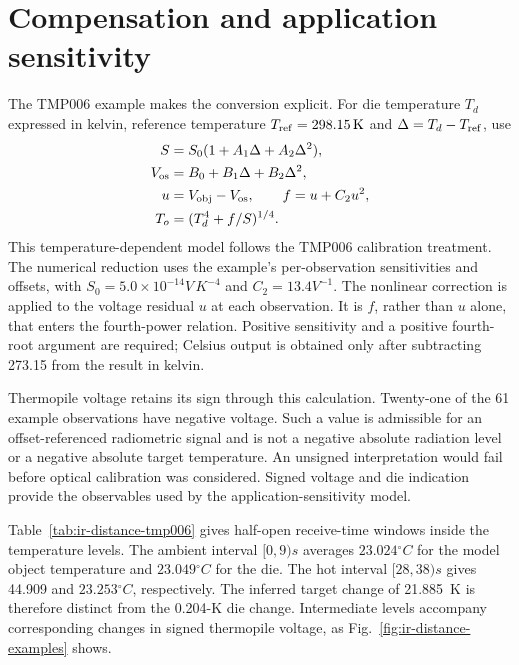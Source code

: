 \section{Compensation and application sensitivity}
The TMP006 example makes the conversion explicit. For die temperature $T_d$ expressed in kelvin, reference temperature $T_{\rm ref}=298.15\,\mathrm{K}$ and $\Delta=T_d-T_{\rm ref}$, use
\begin{equation}
 \begin{aligned}
 S&=S_0(1+A_1\Delta+A_2\Delta^2),\\
 V_{\rm os}&=B_0+B_1\Delta+B_2\Delta^2,\\
 u&=V_{\rm obj}-V_{\rm os},\qquad f=u+C_2u^2,\\
 T_o&=(T_d^4+f/S)^{1/4}.
 \end{aligned}
 \label{eq:ir-distance-compensation}
\end{equation}
This temperature-dependent model follows the TMP006 calibration treatment\cite{tmp006guide}. The numerical reduction uses the example's per-observation sensitivities and offsets, with $S_0=5.0\times10^{-14}\unit{V\,K^{-4}}$ and $C_2=13.4\unit{V^{-1}}$. The nonlinear correction is applied to the voltage residual $u$ at each observation. It is $f$, rather than $u$ alone, that enters the fourth-power relation. Positive sensitivity and a positive fourth-root argument are required; Celsius output is obtained only after subtracting 273.15 from the result in kelvin.

Thermopile voltage retains its sign through this calculation. Twenty-one of the 61 example observations have negative voltage. Such a value is admissible for an offset-referenced radiometric signal and is not a negative absolute radiation level or a negative absolute target temperature. An unsigned interpretation would fail before optical calibration was considered. Signed voltage and die indication provide the observables used by the application-sensitivity model.

Table~\ref{tab:ir-distance-tmp006} gives half-open receive-time windows inside the temperature levels. The ambient interval $[0,9)\unit{s}$ averages $23.024\unit{^\circ C}$ for the model object temperature and $23.049\unit{^\circ C}$ for the die. The hot interval $[28,38)\unit{s}$ gives 44.909 and $23.253\unit{^\circ C}$, respectively. The inferred target change of 21.885~K is therefore distinct from the 0.204-K die change. Intermediate levels accompany corresponding changes in signed thermopile voltage, as Fig.~\ref{fig:ir-distance-examples} shows.

